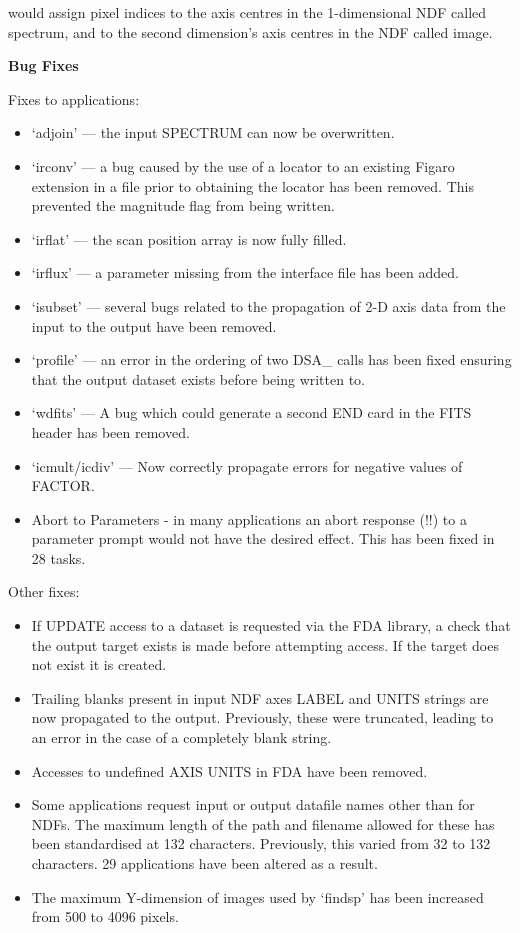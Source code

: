    would assign pixel indices to the axis centres in the 1-dimensional
   NDF called spectrum, and to the second dimension's axis centres in
   the NDF called image.


{\bf    Bug Fixes}

   Fixes to applications:

\begin{itemize}
\item `adjoin'  --- the input SPECTRUM can now be overwritten.
\item `irconv'  --- a bug caused by the use of a locator to an existing
	        Figaro extension in a file prior to obtaining the
	        locator has been removed.  This prevented the
	        magnitude flag from being written.
\item `irflat'  --- the scan position array is now fully filled.
\item `irflux'  --- a parameter missing from the interface file has
                been added.
\item `isubset' --- several bugs related to the propagation of 2-D
		axis data from the input to the output have been
		removed.
\item `profile' --- an error in the ordering of two DSA\_ calls has
		been fixed ensuring that the output dataset exists
		before being written to.
\item `wdfits'  --- A bug which could generate a second END card in the
                FITS header has been removed.
\item `icmult/icdiv' --- Now correctly propagate errors for negative values
                of FACTOR.
\item Abort to Parameters - in many applications an abort response
		(!!) to a parameter prompt would not have the
		desired effect.  This has been fixed in 28 tasks.
\end{itemize}

   Other fixes:

\begin{itemize}
\item If UPDATE access to a dataset is requested via the FDA
      library, a check that the output target exists is made
      before attempting access.  If the target does not exist it
      is created.
\item Trailing blanks present in input NDF axes LABEL and UNITS
      strings are now propagated to the output.  Previously, these
      were truncated, leading to an error in the case of a
      completely blank string.
\item Accesses to undefined AXIS UNITS in FDA have been removed.
\item Some applications request input or output datafile names
      other than for NDFs.  The maximum length of the path and
      filename allowed for these has been standardised at 132
      characters.  Previously, this varied from 32 to 132
      characters.  29 applications have been altered as a result.
\item The maximum Y-dimension of images used by `findsp' has been increased
      from 500 to 4096 pixels.
\end{itemize}


